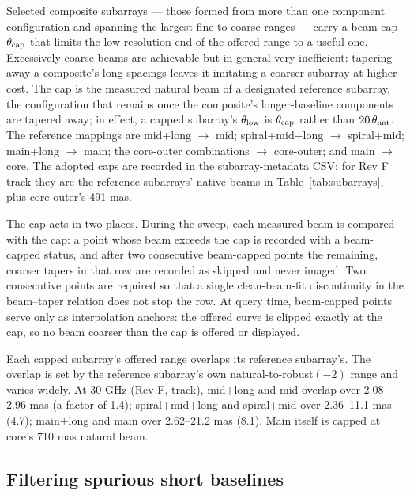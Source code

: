 \documentclass[11pt]{article}
\begin{document}
Selected composite subarrays --- those formed from more than one component
configuration and spanning the largest fine-to-coarse ranges --- carry a
beam cap $\theta_{\rm cap}$ that limits the low-resolution end of the
offered range to a useful one.  Excessively coarse beams are achievable
but in general very inefficient: tapering away a composite's long spacings
leaves it imitating a coarser subarray at higher cost.  The cap is the
measured natural beam of a designated reference subarray, the
configuration that remains once the composite's longer-baseline components
are tapered away; in effect, a capped subarray's $\theta_{\rm low}$ is
$\theta_{\rm cap}$ rather than $20\,\theta_{\rm nat}$.  The reference
mappings are mid+long $\to$ mid; spiral+mid+long $\to$ spiral+mid;
main+long $\to$ main; the core-outer combinations $\to$ core-outer; and
main $\to$ core.  The adopted caps are recorded in the subarray-metadata
CSV; for Rev F track they are the reference subarrays' native beams in
Table~\ref{tab:subarrays}, plus core-outer's 491 mas.

The cap acts in two places.  During the sweep, each measured beam is
compared with the cap: a point whose beam exceeds the cap is recorded with
a beam-capped status, and after two consecutive beam-capped points the
remaining, coarser tapers in that row are recorded as skipped and never
imaged.  Two consecutive points are required so that a single
clean-beam-fit discontinuity in the beam--taper relation does not stop the
row.  At query time, beam-capped points serve only as interpolation
anchors: the offered curve is clipped exactly at the cap, so no beam
coarser than the cap is offered or displayed.

Each capped subarray's offered range overlaps its reference subarray's.
The overlap is set by the reference subarray's own natural-to-robust$(-2)$
range and varies widely.  At 30 GHz (Rev F, track), mid+long and mid overlap
over 2.08--2.96 mas (a factor of 1.4); spiral+mid+long and spiral+mid over
2.36--11.1 mas (4.7); main+long and main over 2.62--21.2 mas (8.1).  Main
itself is capped at core's 710 mas natural beam.

\subsection{Filtering spurious short baselines}
\label{sec:uvfilter}
\end{document}
